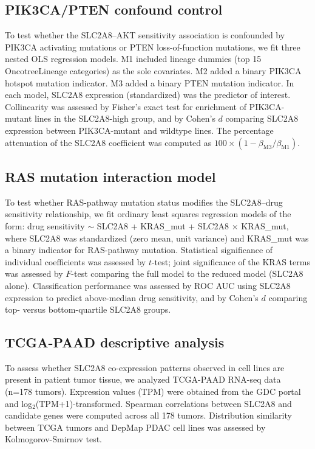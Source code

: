 \documentclass[12pt]{article}
\begin{document}
\subsection{PIK3CA/PTEN confound control}

To test whether the SLC2A8--AKT sensitivity association is confounded by
PIK3CA activating mutations or PTEN loss-of-function mutations, we fit
three nested OLS regression models. M1 included lineage dummies (top 15
OncotreeLineage categories) as the sole covariates. M2 added a binary
PIK3CA hotspot mutation indicator. M3 added a binary PTEN mutation
indicator. In each model, SLC2A8 expression (standardized) was the
predictor of interest. Collinearity was assessed by Fisher's exact test
for enrichment of PIK3CA-mutant lines in the SLC2A8-high group, and by
Cohen's $d$ comparing SLC2A8 expression between PIK3CA-mutant and
wildtype lines. The percentage attenuation of the SLC2A8 coefficient
was computed as $100 \times (1 - \beta_{\mathrm{M3}} /
\beta_{\mathrm{M1}})$.

\subsection{RAS mutation interaction model}

To test whether RAS-pathway mutation status modifies the SLC2A8--drug
sensitivity relationship, we fit ordinary least squares regression
models of the form: drug sensitivity $\sim$ SLC2A8 + KRAS\_mut +
SLC2A8 $\times$ KRAS\_mut, where SLC2A8 was standardized
(zero mean, unit variance) and KRAS\_mut was a binary indicator for
RAS-pathway mutation. Statistical significance of individual coefficients
was assessed by $t$-test; joint significance of the KRAS terms was
assessed by $F$-test comparing the full model to the reduced model
(SLC2A8 alone). Classification performance was assessed by ROC AUC using
SLC2A8 expression to predict above-median drug sensitivity, and by
Cohen's $d$ comparing top- versus bottom-quartile SLC2A8 groups.

\subsection{TCGA-PAAD descriptive analysis}

To assess whether SLC2A8 co-expression patterns observed in cell lines
are present in patient tumor tissue, we analyzed TCGA-PAAD RNA-seq data
(n=178 tumors). Expression values (TPM) were obtained from the GDC
portal and log$_2$(TPM+1)-transformed. Spearman correlations between
SLC2A8 and candidate genes were computed across all 178 tumors.
Distribution similarity between TCGA tumors and DepMap PDAC cell lines
was assessed by Kolmogorov-Smirnov test.
\end{document}

